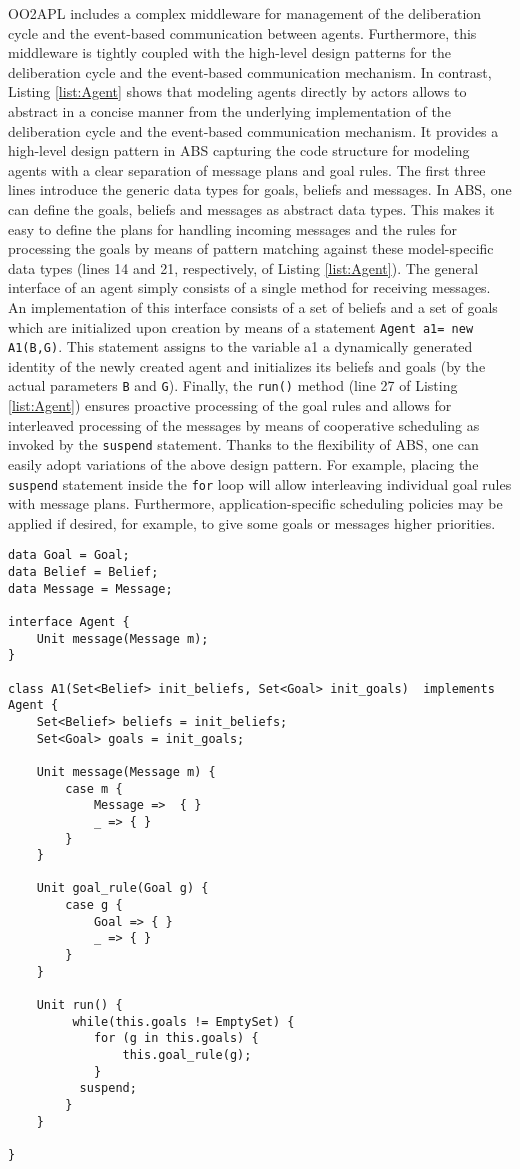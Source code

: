 OO2APL  includes a complex middleware for management of the deliberation cycle and the event-based communication between agents. 
Furthermore, this middleware is tightly coupled with the high-level design patterns for the deliberation cycle and  the event-based communication mechanism.
In contrast,  Listing \ref{list:Agent} shows that modeling agents directly by actors  allows to abstract in a concise manner from the underlying implementation of the deliberation cycle  and the event-based communication mechanism.
It provides  a high-level design pattern in ABS capturing the code structure for modeling agents with a clear separation of message plans and goal rules. 
The first three lines introduce the generic data types for goals, beliefs and messages.
In ABS, one can define the goals, beliefs and messages as abstract data types.
This makes it easy to define the plans for  handling incoming messages and the rules for processing the goals by means of pattern matching against these model-specific data types (lines 14 and 21, respectively, of Listing \ref{list:Agent}).
The general interface of an agent simply consists of a single method for receiving  messages. An  implementation of this interface consists of a set of beliefs and a set of goals which are initialized upon creation by means of a statement
\lstinline|Agent a1= new A1(B,G)|.
This statement  assigns to the variable a1 a dynamically generated  identity of the newly created agent and initializes its beliefs and goals (by  the actual parameters \lstinline|B| and \lstinline|G|).
Finally,  the \lstinline|run()| method (line 27 of  Listing \ref{list:Agent}) ensures proactive processing of the goal rules and allows for
interleaved processing of the messages by means of cooperative scheduling as invoked by the \lstinline|suspend| statement.
Thanks to the flexibility of ABS, one can easily adopt variations of the above design pattern.
For example, placing the \lstinline|suspend| statement inside the \lstinline|for| loop will allow interleaving individual goal rules with message plans.
Furthermore, application-specific scheduling policies \cite{rabs,cog}  may be applied if desired, for example, to give some goals or messages higher priorities.



\begin{lstlisting}[caption= Generic Agent Model, label=list:Agent]
data Goal = Goal;
data Belief = Belief;
data Message = Message;

interface Agent {
	Unit message(Message m);
}

class A1(Set<Belief> init_beliefs, Set<Goal> init_goals)  implements Agent {
	Set<Belief> beliefs = init_beliefs;
	Set<Goal> goals = init_goals;
	
	Unit message(Message m) {
		case m { 
			Message =>  { }
			_ => { }
		}
	}
	
	Unit goal_rule(Goal g) {
		case g {
			Goal => { }
			_ => { }
		}
	}
	
	Unit run() {
		 while(this.goals != EmptySet) {
  		    for (g in this.goals) {
		        this.goal_rule(g);
		    }
		  suspend;
		}
	}

}

\end{lstlisting}

